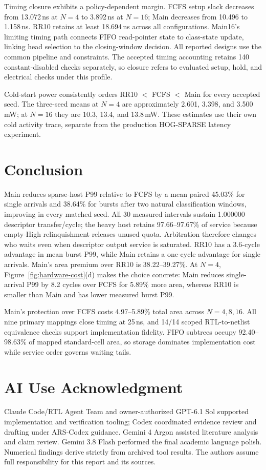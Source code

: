Timing closure exhibits a policy-dependent margin.
FCFS setup slack decreases from 13.072\,ns at $N=4$ to 3.892\,ns at
$N=16$; Main decreases from 10.496 to 1.158\,ns. RR10 retains at least
18.694\,ns across all configurations. Main16's limiting timing path connects FIFO read-pointer state to
class-state update, linking head selection to the closing-window decision.
All reported designs use the common pipeline and constraints. The accepted
timing accounting retains 140 constant-disabled checks separately, so closure
refers to evaluated setup, hold, and electrical checks under this profile.

Cold-start power consistently orders RR10 $<$ FCFS $<$ Main for every
accepted seed. The three-seed means at $N=4$ are approximately 2.601,
3.398, and 3.500\,mW; at $N=16$ they are 10.3, 13.4, and 13.8\,mW. These
estimates use their own cold activity trace, separate from the production
HOG-SPARSE latency experiment.

\section{Conclusion}

Main reduces sparse-host P99 relative to FCFS by a mean paired 45.03\% for
single arrivals and 38.64\% for bursts after two natural classification
windows, improving in every matched seed. All 30 measured intervals sustain
1.000000 descriptor transfer/cycle; the heavy host retains 97.66--97.67\%
of service because empty-High relinquishment releases unused quota.
Arbitration therefore changes who waits even when descriptor output service
is saturated. RR10 has a 3.6-cycle advantage in mean burst P99, while Main
retains a one-cycle advantage for single arrivals. Main's area premium over
RR10 is 38.22--39.27\%. At $N=4$, Figure~\ref{fig:hardware-cost}(d) makes
the choice concrete: Main reduces single-arrival P99 by 8.2 cycles over FCFS
for 5.89\% more area, whereas RR10 is smaller than Main and has lower
measured burst P99.

Main's protection over FCFS costs 4.97--5.89\% total area across $N=4,8,16$.
All nine primary mappings close timing at 25\,ns, and 14/14 scoped
RTL-to-netlist equivalence checks support implementation fidelity. FIFO
subtrees occupy 92.40--98.63\% of mapped standard-cell area, so storage
dominates implementation cost while service order governs waiting tails.

\section{AI Use Acknowledgment}
Claude Code/RTL Agent Team and owner-authorized GPT-6.1 Sol supported implementation
and verification tooling; Codex coordinated evidence review and drafting under ARS-Codex guidance.
Gemini 4 Argon assisted literature analysis and claim review.
Gemini 3.8 Flash performed the final academic language polish.
Numerical findings derive strictly from archived tool results.
The authors assume full responsibility for this report and its sources.


